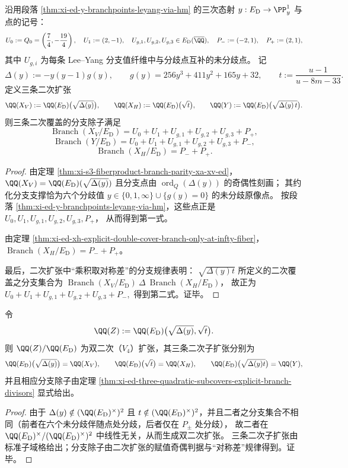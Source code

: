 \begin{theorem}[三条二次子覆盖的分支除子之显式识别]\label{thm:xi-ed-three-quadratic-subcovers-explicit-branch-divisors}
沿用段落 \ref{thm:xi-ed-y-branchpoints-leyang-via-hm} 的三次态射 \(y:E_{\mathrm D}\to\PP^1_y\) 与点的记号：
\[
U_0:=Q_0=\left(\frac74,-\frac{19}{4}\right),\quad
U_1:=(2,-1),\quad
U_{g,1},U_{g,2},U_{g,3}\in E_{\mathrm D}(\overline\QQ),
\quad
P_-:=(-2,1),\quad P_+:=(2,1),
\]
其中 \(U_{g,i}\) 为每条 Lee--Yang 分支值纤维中与分歧点互补的未分歧点。
记
\[
\Delta(y):=-y(y-1)g(y),\qquad g(y)=256y^3+411y^2+165y+32,
\qquad
t:=\frac{u-1}{u-8m-33}.
\]
定义三条二次扩张
\[
\QQ(X_V):=\QQ(E_{\mathrm D})\bigl(\sqrt{\Delta(y)}\bigr),\qquad
\QQ(X_H):=\QQ(E_{\mathrm D})\bigl(\sqrt{t}\bigr),\qquad
\QQ(Y):=\QQ(E_{\mathrm D})\bigl(\sqrt{\Delta(y)\,t}\bigr).
\]
则三条二次覆盖的分支除子满足
\[
\operatorname{Branch}(X_V/E_{\mathrm D})
=U_0+U_1+U_{g,1}+U_{g,2}+U_{g,3}+P_+,
\]
\[
\operatorname{Branch}(Y/E_{\mathrm D})
=U_0+U_1+U_{g,1}+U_{g,2}+U_{g,3}+P_-,
\]
\[
\operatorname{Branch}(X_H/E_{\mathrm D})=P_-+P_+.
\]
\end{theorem}
\begin{proof}
由定理 \ref{thm:xi-s3-fiberproduct-branch-parity-xa-xv-ed}，
\(
\QQ(X_V)=\QQ(E_{\mathrm D})(\sqrt{\Delta(y)})
\)
且分支点由 \(\operatorname{ord}_Q(\Delta(y))\) 的奇偶性刻画；
其约化分支支撑恰为六个分歧值 \(y\in\{0,1,\infty\}\cup\{g(y)=0\}\) 的未分歧原像点。
按段落 \ref{thm:xi-ed-y-branchpoints-leyang-via-hm}，这些点正是
\(
U_0,U_1,U_{g,1},U_{g,2},U_{g,3},P_+
\)，
从而得到第一式。

由定理 \ref{thm:xi-ed-xh-explicit-double-cover-branch-only-at-infty-fiber}，
\(\operatorname{Branch}(X_H/E_{\mathrm D})=P_-+P_+\)。

最后，二次扩张中“乘积取对称差”的分支规律表明：
\(\sqrt{\Delta(y)t}\) 所定义的二次覆盖之分支集合为
\(\operatorname{Branch}(X_V/E_{\mathrm D})\ \Delta\ \operatorname{Branch}(X_H/E_{\mathrm D})\)，
故正为
\(
U_0+U_1+U_{g,1}+U_{g,2}+U_{g,3}+P_-,
\)
得到第二式。证毕。
\end{proof}

\begin{proposition}[双二次子域格与三条二次子扩张]\label{prop:xi-ed-v4-biquadratic-subfield-lattice}
令
\[
\QQ(Z):=\QQ(E_{\mathrm D})\bigl(\sqrt{\Delta(y)},\sqrt{t}\bigr).
\]
则 \(\QQ(Z)/\QQ(E_{\mathrm D})\) 为双二次（\(V_4\)）扩张，其三条二次子扩张分别为
\[
\QQ(E_{\mathrm D})\bigl(\sqrt{\Delta(y)}\bigr)=\QQ(X_V),\qquad
\QQ(E_{\mathrm D})\bigl(\sqrt{t}\bigr)=\QQ(X_H),\qquad
\QQ(E_{\mathrm D})\bigl(\sqrt{\Delta(y)t}\bigr)=\QQ(Y),
\]
并且相应分支除子由定理 \ref{thm:xi-ed-three-quadratic-subcovers-explicit-branch-divisors} 显式给出。
\end{proposition}
\begin{proof}
由于 \(\Delta(y)\notin (\QQ(E_{\mathrm D})^\times)^2\) 且 \(t\notin(\QQ(E_{\mathrm D})^\times)^2\)，并且二者之分支集合不相同（前者在六个未分歧伴随点处分歧，后者仅在 \(P_\pm\) 处分歧），
故二者在 \(\QQ(E_{\mathrm D})^\times/(\QQ(E_{\mathrm D})^\times)^2\) 中线性无关，从而生成双二次扩张。
三条二次子扩张由标准子域格给出；分支除子由二次扩张的赋值奇偶判据与“对称差”规律得到。证毕。
\end{proof}


